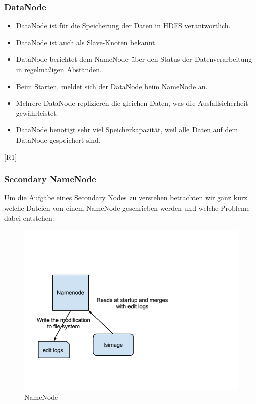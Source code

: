\subsubsection{DataNode}
\begin{itemize}
\item DataNode ist für die Speicherung der Daten in HDFS verantwortlich.
\item DataNode ist auch als Slave-Knoten bekannt.
\item DataNode berichtet dem NameNode über den Status der Datenverarbeitung in regelmäßigen Abständen. 
\item Beim Starten, meldet sich der DataNode beim NameNode an.
\item Mehrere DataNode replizieren die gleichen Daten, was die Ausfallsicherheit gewährleistet.
\item DataNode benötigt sehr viel Speicherkapazität, weil alle Daten auf dem DataNode gespeichert sind.
\end{itemize}
[R1]
\subsubsection{Secondary NameNode}
Um die Aufgabe eines Secondary Nodes zu verstehen betrachten wir ganz kurz welche Dateien von einem NameNode geschrieben werden und welche Probleme dabei entstehen:
\begin{figure}
	\centering
	\includegraphics{images/namenode.png}
	\caption{NameNode}
	\label{img:grafik-nameNode}
\end{figure}

